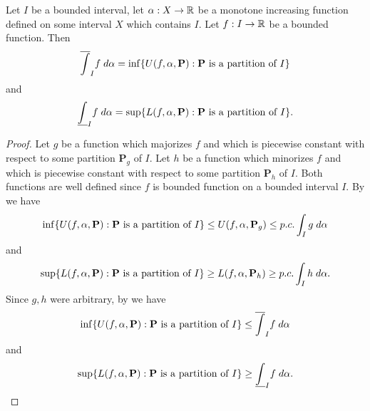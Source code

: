 \begin{ac}\label{i:ac:11.8.14}
  Let \(I\) be a bounded interval, let \(\alpha : X \to \mathbb{R}\) be a monotone increasing function defined on some interval \(X\) which contains \(I\).
  Let \(f : I \to \mathbb{R}\) be a bounded function.
  Then
  \[
    \overline{\int}_I f \; d \alpha = \inf\set{U(f, \alpha, \mathbf{P}) : \mathbf{P} \text{ is a partition of } I}
  \]
  and
  \[
    \underline{\int}_I f \; d \alpha = \sup\set{L(f, \alpha, \mathbf{P}) : \mathbf{P} \text{ is a partition of } I}.
  \]
\end{ac}

\begin{proof}
  Let \(g\) be a function which majorizes \(f\) and which is piecewise constant with respect to some partition \(\mathbf{P}_g\) of \(I\).
  Let \(h\) be a function which minorizes \(f\) and which is piecewise constant with respect to some partition \(\mathbf{P}_h\) of \(I\).
  Both functions are well defined since \(f\) is bounded function on a bounded interval \(I\).
  By  we have
  \[
    \inf\set{U(f, \alpha, \mathbf{P}) : \mathbf{P} \text{ is a partition of } I} \leq U(f, \alpha, \mathbf{P}_g) \leq p.c. \int_I g \; d \alpha
  \]
  and
  \[
    \sup\set{L(f, \alpha, \mathbf{P}) : \mathbf{P} \text{ is a partition of } I} \geq L(f, \alpha, \mathbf{P}_h) \geq p.c. \int_I h \; d \alpha.
  \]
  Since \(g, h\) were arbitrary, by  we have
  \[
    \inf\set{U(f, \alpha, \mathbf{P}) : \mathbf{P} \text{ is a partition of } I} \leq \overline{\int}_I f \; d \alpha
  \]
  and
  \[
    \sup\set{L(f, \alpha, \mathbf{P}) : \mathbf{P} \text{ is a partition of } I} \geq \underline{\int}_I f \; d \alpha.
  \]


\end{proof}
